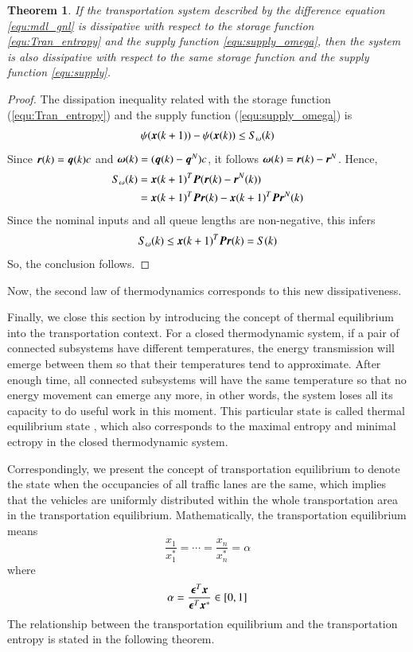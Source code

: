 \documentclass[preprint,authoryear,12pt]{elsarticle}
\renewcommand{\vec}[1]{\mbox{\boldmath$#1$}}
\newcommand{\mat}[1]{\mbox{\boldmath$#1$}}
\newtheorem{thm}{Theorem}
\begin{document}
\begin{thm}
If the transportation system described by the difference equation
\eqref{equ:mdl_gnl} is dissipative with respect to the storage
function \eqref{equ:Tran_entropy} and the supply function
\eqref{equ:supply_omega}, then the system is also dissipative with
respect to the same storage function and the supply function
\eqref{equ:supply}.
\end{thm}
\begin{proof}
The dissipation inequality related with the storage function
(\ref{equ:Tran_entropy}) and the supply function
(\ref{equ:supply_omega}) is
\begin{equation}\label{equ:dissipative_omega}
  \psi(\vec{x}(k+1))-\psi(\vec{x}(k)) \leq S_\omega(k)
\end{equation}
Since $\vec{r}(k)=\vec{q}(k)c$ and
$\vec{\omega}(k)=(\vec{q}(k)-\vec{q}^N)c$, it follows
$\vec{\omega}(k)=\vec{r}(k)-\vec{r}^N$. Hence,
\begin{align*}
S_\omega(k) &= \vec{x}(k+1)^T \mat{P} (\vec{r}(k)-\vec{r}^N(k))\\
    &= \vec{x}(k+1)^T \mat{P} \vec{r}(k)-\vec{x}(k+1)^T \mat{P}
\vec{r}^N(k)
\end{align*}
Since the nominal inputs and all queue lengths are non-negative, this
infers
$$S_\omega(k)\leq \vec{x}(k+1)^T \mat{P} \vec{r}(k) = S(k)$$
So, the conclusion follows.
\end{proof}
Now, the second law of thermodynamics corresponds to this new
dissipativeness.

Finally, we close this section by introducing the concept of thermal
equilibrium into the transportation context. For a closed
thermodynamic system, if a pair of connected subsystems have
different temperatures, the energy transmission will emerge between
them so that their temperatures tend to approximate. After enough
time, all connected subsystems will have the same temperature so that
no energy movement can emerge any more, in other words, the system
loses all its capacity to do useful work in this moment. This
particular state is called thermal equilibrium state
\citep{cengel_thermodynamics:_2001}, which also corresponds to the
maximal entropy and minimal ectropy in the closed thermodynamic
system.

Correspondingly, we present the concept of transportation equilibrium
to denote the state when the occupancies of all traffic lanes are the
same, which implies that the vehicles are uniformly distributed
within the whole transportation area in the transportation
equilibrium. Mathematically, the transportation equilibrium means
\begin{equation}\label{equ:equilibrium}
\frac{x_1}{x_1^*}=\cdots=\frac{x_n}{x_n^*}=\alpha
\end{equation}
where
$$\alpha = \frac{\vec{\epsilon}^T\vec{x}}{\vec{\epsilon}^T\vec{x}^*}
\in[0,1]$$
The relationship between the transportation equilibrium and the
transportation entropy is stated in the following theorem.
\end{document}
